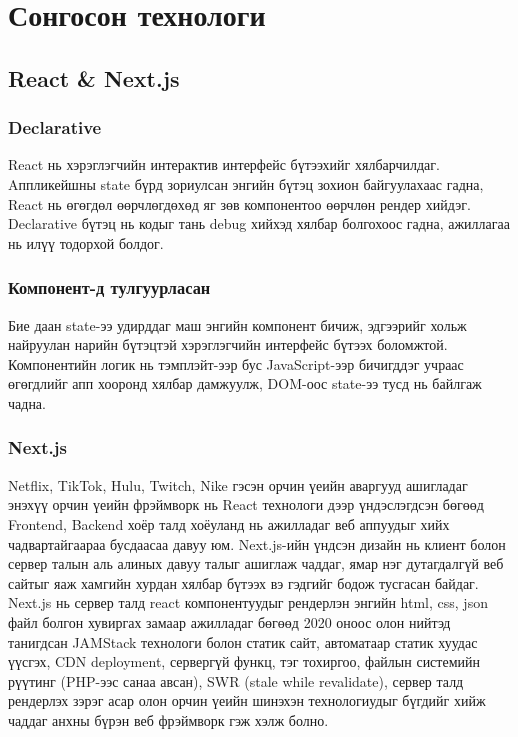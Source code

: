 \section{Сонгосон технологи}
\subsection{React \& Next.js}
\subsubsection{Declarative}
React нь хэрэглэгчийн интерактив интерфейс бүтээхийг хялбарчилдаг. Aппликейшны state бүрд зориулсан энгийн бүтэц зохион байгуулахаас гадна, React нь өгөгдөл өөрчлөгдөхөд яг зөв компонентоо өөрчлөн рендер хийдэг. Declarative бүтэц нь кодыг тань debug хийхэд хялбар болгохоос гадна, ажиллагаа нь илүү тодорхой болдог.

\subsubsection{Компонент-д тулгуурласан}
Бие даан state-ээ удирддаг маш энгийн компонент бичиж, эдгээрийг хольж найруулан нарийн бүтэцтэй хэрэглэгчийн интерфейс бүтээх боломжтой. Компонентийн логик нь тэмплэйт-ээр бус JavaScript-ээр бичигддэг учраас өгөгдлийг апп хооронд хялбар дамжуулж, DOM-оос state-ээ тусд нь байлгаж чадна.

\subsubsection{Next.js}
Netflix, TikTok, Hulu, Twitch, Nike гэсэн орчин үеийн аваргууд ашигладаг энэхүү орчин үеийн фрэймворк нь React технологи дээр үндэслэгдсэн бөгөөд Frontend, Backend хоёр талд хоёуланд нь ажилладаг веб аппуудыг хийх чадвартайгаараа бусдаасаа давуу юм. Next.js-ийн үндсэн дизайн нь клиент болон сервер талын аль алиных давуу талыг ашиглаж чаддаг, ямар нэг дутагдалгүй веб сайтыг яаж хамгийн хурдан хялбар бүтээх вэ гэдгийг бодож тусгасан байдаг. Next.js нь сервер талд react компонентуудыг рендерлэн энгийн html, css, json файл болгон хувиргах замаар ажилладаг бөгөөд 2020 оноос олон нийтэд танигдсан JAMStack технологи болон статик сайт, автоматаар статик хуудас үүсгэх, CDN deployment, сервергүй функц, тэг тохиргоо, файлын системийн рүүтинг (PHP-ээс санаа авсан), SWR (stale while revalidate), сервер талд рендерлэх зэрэг асар олон орчин үеийн шинэхэн технологиудыг бүгдийг хийж чаддаг анхны бүрэн веб фрэймворк гэж хэлж болно.

